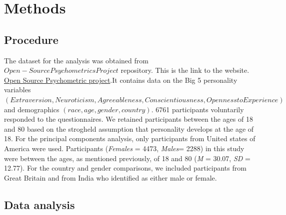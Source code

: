 \documentclass[
  english,
  man]{apa6}
\begin{document}
\hypertarget{methods}{%
\section{Methods}\label{methods}}

\hypertarget{procedure}{%
\subsection{Procedure}\label{procedure}}

The dataset for the analysis was obtained from \(Open-Source Psychometrics Project\) repository. This is the link to the website. \href{https://openpsychometrics.org/_rawdata/}{Open Source Psychometric project}.It contains data on the Big 5 personality variables \((Extraversion, Neuroticism, Agreeableness, Conscientiousness, Openness to Experience)\) and demographics \((race, age, gender, country)\). 6761 participants voluntarily responded to the questionnaires. We retained participants between the ages of 18 and 80 based on the strogheld assumption that personality develops at the age of 18. For the principal components analysis, only participants from United states of America were used. Participants (\emph{Females} = 4473, \emph{Males}= 2288) in this study were between the ages, as mentioned previously, of 18 and 80 (\emph{M} = 30.07, \emph{SD} = 12.77).
For the country and gender comparisons, we included participants from Great Britain and from India who identified as either male or female.

\hypertarget{data-analysis}{%
\subsection{Data analysis}\label{data-analysis}}
\end{document}
